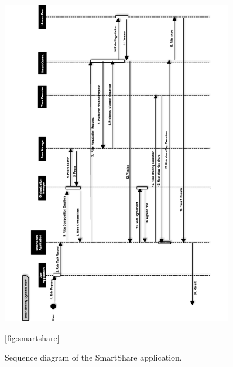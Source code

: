 \begin{figure}
\centering
\includegraphics[width=0.9\textwidth]{./figs/sequenceRide}
\caption{Sequence diagram of the SmartShare application.}
\label{fig:dynamic_share}
\ref{fig:smartshare}
\end{figure}

